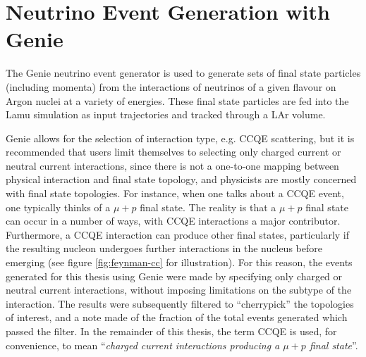 \section{Neutrino Event Generation with Genie}\label{sec:genie}
The Genie\citep{Genie} neutrino event generator is used to generate sets of final state particles (including momenta) from the interactions of neutrinos of a given flavour on Argon nuclei at a variety of energies. These final state particles are fed into the Lamu simulation as input trajectories and tracked through a \ac{LAr} volume.

Genie allows for the selection of interaction type, e.g. \ac{CCQE} scattering, but it is recommended that users limit themselves to selecting only charged current or neutral current interactions, since there is not a one-to-one mapping between physical interaction and final state topology, and physicists are mostly concerned with final state topologies. For instance, when one talks about a \ac{CCQE} event, one typically thinks of a $\mu+p$ final state. The reality is that a $\mu+p$ final state can occur in a number of ways, with \ac{CCQE} interactions a major contributor. Furthermore, a \ac{CCQE} interaction can produce other final states, particularly if the resulting nucleon undergoes further interactions in the nucleus before emerging (see figure \ref{fig:feynman-cc} for illustration). For this reason, the events generated for this thesis using Genie were made by specifying only charged or neutral current interactions, without imposing limitations on the subtype of the interaction. The results were subsequently filtered to ``cherrypick'' the topologies of interest, and a note made of the fraction of the total events generated which passed the filter. In the remainder of this thesis, the term CCQE is used, for convenience, to mean ``\emph{charged current interactions producing a $\mu + p$ final state}''.

